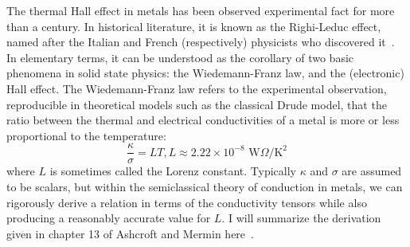 \documentclass{thesis-umich}
\begin{document}
The thermal Hall effect in metals has been observed experimental fact for more
than a century. In historical literature, it is known as the Righi-Leduc effect,
named after the Italian and French (respectively) physicists who discovered
it~\cite{Bridgman1924}. In elementary terms, it can be understood as the
corollary of two basic phenomena in solid state physics: the Wiedemann-Franz
law, and the (electronic) Hall effect. The Wiedemann-Franz law refers to the
experimental observation, reproducible in theoretical models such as the
classical Drude model, that the ratio between the thermal and electrical
conductivities of a metal is more or less proportional to the temperature:
\[ \frac{\kappa}{\sigma} = LT, L \approx 2.22 \times 10^{-8}
\textrm{ W}\Omega/\mathrm{K}^2\]
where $L$ is sometimes called the Lorenz constant. Typically $\kappa$ and
$\sigma$ are assumed to be scalars, but within the semiclassical theory of
conduction in metals, we can rigorously derive a relation in terms of the
conductivity tensors while also producing a reasonably accurate value for
$L$. I will summarize the derivation given in chapter 13 of Ashcroft and Mermin
here~\cite{AshcroftMermin}. 
\end{document}
